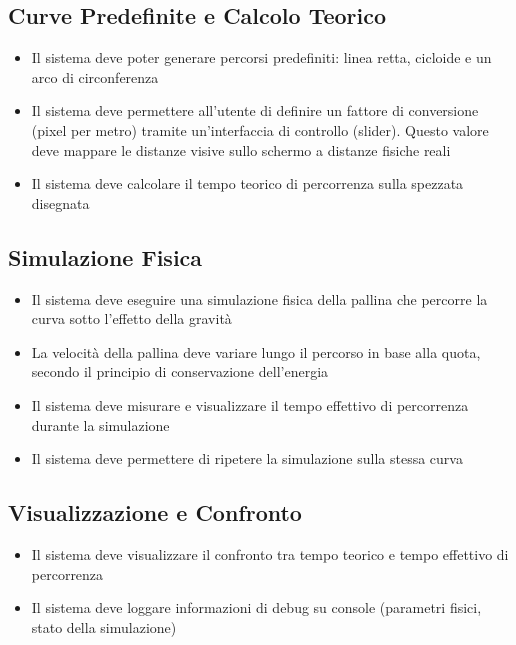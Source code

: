 \documentclass[a4paper,12pt]{article} %
\begin{document}
\subsection{Curve Predefinite e Calcolo Teorico}

\begin{itemize}
    \item Il sistema deve poter generare percorsi predefiniti: linea retta, cicloide e un arco di circonferenza
    \item Il sistema deve permettere all'utente di definire un fattore di conversione (pixel per metro) tramite un'interfaccia di controllo (slider). Questo valore deve mappare le distanze visive sullo schermo a distanze fisiche reali
    \item Il sistema deve calcolare il tempo teorico di percorrenza sulla spezzata disegnata
\end{itemize}

\subsection{Simulazione Fisica}

\begin{itemize}
    \item Il sistema deve eseguire una simulazione fisica della pallina che percorre la curva sotto l'effetto della gravità
    \item La velocità della pallina deve variare lungo il percorso in base alla quota, secondo il principio di conservazione dell'energia
    \item Il sistema deve misurare e visualizzare il tempo effettivo di percorrenza durante la simulazione
    \item Il sistema deve permettere di ripetere la simulazione sulla stessa curva
\end{itemize}

\subsection{Visualizzazione e Confronto}

\begin{itemize}
    \item Il sistema deve visualizzare il confronto tra tempo teorico e tempo effettivo di percorrenza
    \item Il sistema deve loggare informazioni di debug su console (parametri fisici, stato della simulazione)
\end{itemize}
\end{document}
